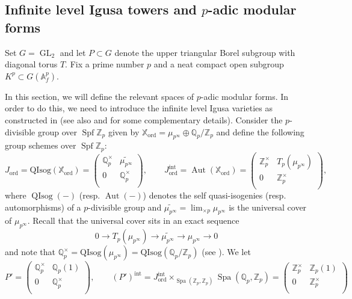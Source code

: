 \documentclass[10pt, oneside]{amsart}
\renewcommand{\tilde}{\widetilde}
\numberwithin{equation}{subsection}
\theoremstyle{definition}
\theoremstyle{remark}
\newcommand{\mbb}[1]{\mathbb{#1}}
\newcommand{\opn}[1]{\operatorname{#1}}
\def\Q{\mathbb{Q}}
\def\Z{{\mathbb{Z}}}
\begin{document}
\subsection{Infinite level Igusa towers and $p$-adic modular forms}

Set $G = \opn{GL}_2$ and let $P \subset G$ denote the upper triangular Borel subgroup with diagonal torus $T$. Fix a prime number $p$ and a neat compact open subgroup $K^p \subset G(\mbb{A}^p_f)$. 

In this section, we will define the relevant spaces of $p$-adic modular forms. In order to do this, we need to introduce the infinite level Igusa varieties as constructed in \cite[\S 4.3]{CS17} (see also \cite{howe2020unipotent} and \cite[\S 3.4]{BPHHT} for some complementary details). Consider the $p$-divisible group over $\opn{Spf}\mbb{Z}_p$ given by $\mbb{X}_{\opn{ord}} = \mu_{p^{\infty}} \oplus \mbb{Q}_p/\mbb{Z}_p$ and define the following group schemes over $\opn{Spf}\mbb{Z}_p$:
\[
J_{\opn{ord}} = \mathrm{QIsog}( \mathbb{X}_{\opn{ord}}) = \begin{pmatrix} 
      \Q_p^\times & \tilde{\mu_{p^\infty}} \\
      0 & \Q_p^\times \\
   \end{pmatrix}, \quad \quad J_{\opn{ord}}^{\opn{int}} = \opn{Aut}(\mbb{X}_{\opn{ord}}) = \begin{pmatrix} 
      \mbb{Z}_p^\times & T_p(\mu_{p^\infty}) \\
      0 & \mbb{Z}_p^\times \\
   \end{pmatrix},
\]
where $\opn{QIsog}(-)$ (resp. $\opn{Aut}(-)$) denotes the self quasi-isogenies (resp. automorphisms) of a $p$-divisible group and $\tilde{\mu_{p^\infty}} = \opn{lim}_{\times p} \mu_{p^{\infty}}$ is the universal cover of $\mu_{p^{\infty}}$. Recall that the universal cover sits in an exact sequence
\begin{equation*} \label{EqExactSeqmuinfty}
0 \to T_p(\mu_{p^\infty}) \to \widetilde{\mu_{p^\infty}} \to \mu_{p^\infty} \to 0
\end{equation*}
and note that $\Q_p^\times =  \mathrm{QIsog}( \mu_{p^\infty}) =  \mathrm{QIsog}( \Q_p/\Z_p)$ (see \cite[\S 3.1]{ScholzeWeinstein}). We let 
\[
P' =    \begin{pmatrix} 
      \Q_p^\times & \Q_p(1) \\
      0 & \Q_p^\times \\
   \end{pmatrix}, \quad \quad (P')^{\opn{int}} = J_{\opn{ord}}^{\opn{int}} \times_{\opn{Spa}(\mbb{Z}_p, \mbb{Z}_p)} \opn{Spa}(\mbb{Q}_p, \mbb{Z}_p) = \begin{pmatrix} 
      \mbb{Z}_p^\times & \mbb{Z}_p(1) \\
      0 & \mbb{Z}_p^\times \\
   \end{pmatrix}
\]
\end{document}
